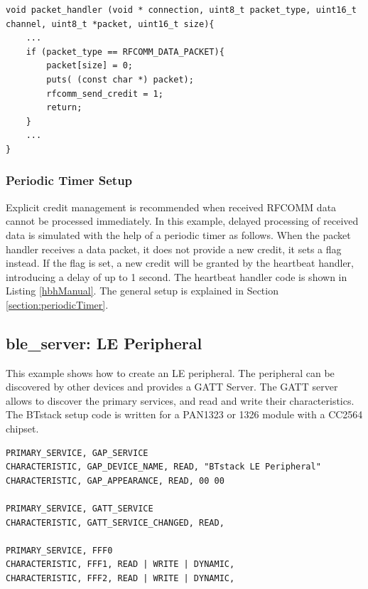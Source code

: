 \documentclass[a4paper,titlepage,oneside,12pt]{amsart} %
\begin{document}
\begin{lstlisting}[caption= Packet handler with manual credit management. , label=phManual]
void packet_handler (void * connection, uint8_t packet_type, uint16_t channel, uint8_t *packet, uint16_t size){
    ...
    if (packet_type == RFCOMM_DATA_PACKET){
        packet[size] = 0;
        puts( (const char *) packet);
        rfcomm_send_credit = 1;
        return;
    }
    ...
}
\end{lstlisting}


\subsubsection{Periodic Timer Setup}

Explicit credit management is recommended when received RFCOMM data cannot be processed immediately. In this example, delayed processing of received data is simulated with the help of a periodic timer as follows. When the packet handler receives a data packet, it does not provide a new credit, it sets a flag instead. If the flag is set, a new credit will be granted by the heartbeat handler, introducing a delay of up to 1 second. The heartbeat handler code is shown in Listing \ref{hbhManual}. The general setup is explained in Section \ref{section:periodicTimer}.


\subsection {ble\_server: LE Peripheral}
\label{example:ble_browser}

This example shows how to create an LE peripheral. The peripheral can be discovered by other devices and provides a GATT Server. The GATT server allows to discover the primary services, and read and write their characteristics. The BTstack setup code is written for a PAN1323 or 1326 module with a CC2564 chipset.

\begin{lstlisting}[caption=ATT Database ., label=code:lePeripheralDatabase]
PRIMARY_SERVICE, GAP_SERVICE
CHARACTERISTIC, GAP_DEVICE_NAME, READ, "BTstack LE Peripheral"
CHARACTERISTIC, GAP_APPEARANCE, READ, 00 00

PRIMARY_SERVICE, GATT_SERVICE
CHARACTERISTIC, GATT_SERVICE_CHANGED, READ,

PRIMARY_SERVICE, FFF0
CHARACTERISTIC, FFF1, READ | WRITE | DYNAMIC, 
CHARACTERISTIC, FFF2, READ | WRITE | DYNAMIC, 
\end{lstlisting}
\end{document}
